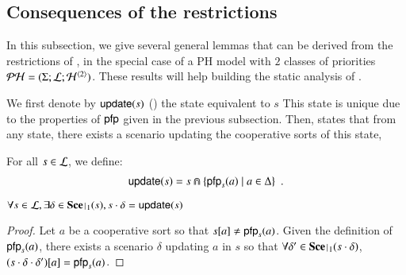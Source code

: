 \subsection{Consequences of the restrictions}

In this subsection, we give several general lemmas that can be derived from the restrictions of ,
in the special case of a PH model with $2$ classes of priorities $\mathcal{PH} = (\Sigma; \mathcal{L}; \mathcal{H}^{\langle 2 \rangle})$.
These results will help building the static analysis of .

We first denote by $\mathsf{update}(s)$ () the state equivalent to $s$
%
This state is unique due to the properties of $\mathsf{pfp}$ given in the previous subsection.
Then,  states that from any state, there exists a scenario updating the cooperative sorts of this state,
%

\begin{definition}[$\update : \PHl \rightarrow \PHl$]
\label{def:update}
  For all $s \in \mathcal{L}$, we define:
  \begin{align*}
    \mathsf{update}(s) = s \Cap \{ \mathsf{pfp}_{s}(a) \mid a \in \Delta \} \enspace.
  \end{align*}
\end{definition}
%
\begin{lemma}
\label{lem:update}
  $\forall s \in \PHl, \exists \delta \in \restriction{\Sce}{1}(s), s \PHplay \delta = \update(s)$
\end{lemma}
%
\begin{proof}
  Let $a$ be a cooperative sort so that ${s[a]} \neq \mathsf{pfp}_s(a)$.
  Given the definition of $\mathsf{pfp}_s(a)$, there exists a scenario $\delta$ updating $a$ in $s$ so that
  $\forall \delta' \in \restriction{\Sce}{1}(s \PHplay \delta)$, ${(s \cdot \delta \cdot \delta')[a]} = \mathsf{pfp}_s(a)$.
\end{proof}

%

